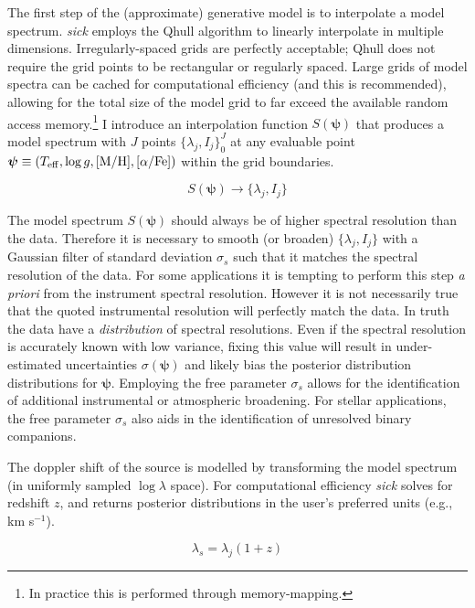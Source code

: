 \documentclass{aastex}
\newcommand{\sick}{\textit{sick}}
\begin{document}
The first step of the (approximate) generative model is to interpolate a model spectrum. \sick{} employs the Qhull algorithm \citep{qhull} to linearly interpolate in multiple dimensions. Irregularly-spaced grids are perfectly acceptable; Qhull does not require the grid points to be rectangular or regularly spaced. Large grids of model spectra can be cached for computational efficiency (and this is recommended), allowing for the total size of the model grid to far exceed the available random access memory.\footnote{In practice this is performed through memory-mapping.} I introduce an interpolation function $S(\bm{\psi})$ that produces a model spectrum with $J$ points $\{\lambda_j,I_j\}_{0}^{J}$ at any evaluable point $\bm{\psi} \equiv (T_{\rm eff},\log{g},{\rm [M/H]},[\alpha/{\rm Fe}])$ within the grid boundaries.

\begin{equation}
S(\bm{\psi}) \rightarrow \{\lambda_j,I_j\}
\end{equation}

The model spectrum $S(\bm{\psi})$ should always be of higher spectral resolution than the data. Therefore it is necessary to smooth (or broaden) $\{\lambda_j,I_j\}$ with a Gaussian filter of standard deviation $\sigma_{s}$ such that it matches the spectral resolution of the data. For some applications it is tempting to perform this step \textit{a priori} from the instrument spectral resolution. However it is not necessarily true that the quoted instrumental resolution will perfectly match the data. In truth the data have a \textit{distribution} of spectral resolutions. Even if the spectral resolution is accurately known with low variance, fixing this value will result in under-estimated uncertainties $\sigma(\bm{\psi})$ and likely bias the posterior distribution distributions for $\bm{\psi}$. Employing the free parameter $\sigma_{s}$ allows for the identification of additional instrumental or atmospheric broadening. For stellar applications, the free parameter $\sigma_{s}$ also aids in the identification of unresolved binary companions.

The doppler shift of the source is modelled by transforming the model spectrum (in uniformly sampled $\log\lambda$ space). For computational efficiency \sick{} solves for redshift $z$, and returns posterior distributions in the user's preferred units (e.g., km s$^{-1}$).

\begin{equation}
\lambda_{s} = \lambda_{j}(1 + z)
\end{equation}
\end{document}
